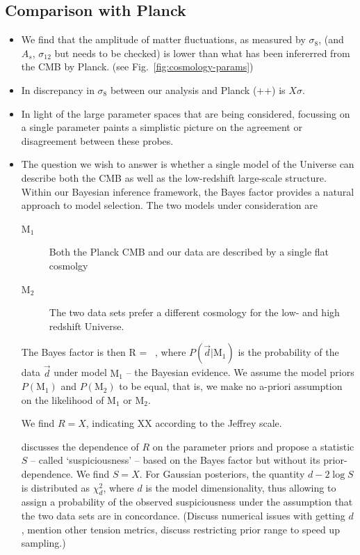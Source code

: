 \subsection{Comparison with Planck}
\label{sec:planck_comp}
\begin{itemize}
	\item We find that the amplitude of matter fluctuations, as measured by $\sigma_{8}$, (and $A_{s}$, $\sigma_{12}$ but needs to be checked) is lower than what has been infererred from the CMB by Planck. (see Fig.~\ref{fig:cosmology-params})
	\item In discrepancy in $\sigma_{8}$ between our  \tttp analysis and Planck (++) is $X\sigma$.
	\item In light of the large parameter spaces that are being considered, focussing on a single parameter paints a simplistic picture on the agreement or disagreement between these probes.
	\item The question we wish to answer is whether a single model of the Universe can describe both the CMB as well as the low-redshift large-scale structure.
	Within our Bayesian inference framework, the Bayes factor provides a natural approach to model selection.
	The two models under consideration are 
	\begin{description}
		\item[$\mathrm{M}_1$] Both the Planck CMB and our \tttp data are described by a single flat \LCDM cosmolgy
		\item[$\mathrm{M}_2$] The two data sets prefer a different cosmology for the low- and high redshift Universe.
	\end{description}
	The Bayes factor is then
	\be
		R =  \ ,
	\ee
	where $P(\vec d | \mathrm{M}_1)$ is the probability of the data $\vec d$ under model $\mathrm{M}_1$ -- the Bayesian evidence. 
	We assume the model priors $P(\mathrm{M}_1)$ and $P(\mathrm{M}_2)$ to be equal, that is, we make no a-priori assumption on the likelihood of $\mathrm{M}_1$ or $\mathrm{M}_2$. 
	
	We find $R=X$, indicating XX according to the Jeffrey scale. 
	
	\citet{Handley2019} discusses the dependence of $R$ on the parameter priors and propose a statistic $S$ -- called `suspiciousness' -- based on the Bayes factor but without its prior-dependence. 
	We find $S=X$. 
	For Gaussian posteriors, the quantity $d-2\log S$ is distributed as $\chi^2_{d}$, where $d$ is the model dimensionality, thus allowing to assign a probability of the observed suspiciousness under the assumption that the two data sets are in concordance.
	(Discuss numerical issues with getting $d$, mention other tension metrics, discuss restricting prior range to speed up sampling.) 
\end{itemize}




